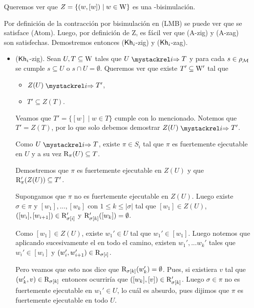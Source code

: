 \begin{demostracion}
    Queremos ver que $Z = \{(w,[w]) \mid w \in \mathrm{W}\}$ es una \KHilogic-bisimulación.
    
    Por definición de la contracción por bisimulación en (LMB) se puede ver que se satisface (Atom). Luego, por definición de Z, es fácil ver que (A-zig) y (A-zag) son satisfechas. Demostremos entonces ($\mathsf{Kh}_i$-zig) y ($\mathsf{Kh}_i$-zag).

    \begin{itemize}
        \item ($\mathsf{Kh}_i$-zig). Sean $U, T \subseteq \mathrm{W}$ tales que $U \ultsExecAgi T$ y para cada $s \in \rho_{\mathcal{M}}$ se cumple $s \subseteq U$ o 
        $s \cap U = \emptyset$. Queremos ver que existe $T' \subseteq \mathrm{W}'$ tal que

        \begin{multicols}{2}
            \begin{itemize}
                \item $Z(U) \ultsExecAgi T'$, 
                \item $T' \subseteq Z(T)$.
            \end{itemize}
        \end{multicols}
        Veamos que $T' = \{[w] \mid w \in T\}$ cumple con lo mencionado. Notemos que $T' = Z(T)$, por lo que solo debemos demostrar 
        $Z(U) \ultsExecAgi T'$.

        Como $U \ultsExecAgi T$, existe $\pi \in S_i$ tal que $\pi$ es fuertemente ejecutable en $U$ y a su vez $\mathrm{R}_\pi(U) \subseteq T$.

        Demostremos que $\pi$ es fuertemente ejecutable en $Z(U)$ y que $\mathrm{R}'_\pi(Z(U)) \subseteq T'$.

        Supongamos que $\pi$ no es fuertemente ejecutable en $Z(U)$. Luego existe $\sigma \in \pi$ y $[w_1],...,[w_k]$ 
        con $1 \le k \le |\sigma|$ tal que $[w_1] \in Z(U)$, $([w_i], [w_{i+1}]) \in \mathrm{R}'_{\sigma[i]}$ y 
        $\mathrm{R}'_{\sigma[k]}([w_k]) = \emptyset$.

        Como $[w_1] \in Z(U)$, existe $w_1' \in U$ tal que $w_1' \in [w_1]$. Luego notemos que aplicando sucesivamente el  
        en todo el camino, existen $w_1',...w_k'$ tales que $w_i' \in [w_i]$ y $(w_i',w_{i+1}') \in \mathrm{R}_{\sigma[i]}$.

        Pero veamos que esto nos dice que $\mathrm{R}_{\sigma[k]}(w_k') = \emptyset$. Pues, si existiera $v$ tal que 
        $(w_k',v) \in \mathrm{R}_{\sigma[k]}$ entonces ocurriría que $([w_k],[v]) \in \mathrm{R}'_{\sigma[k]}$. Luego $\sigma \in \pi$ no es 
        fuertemente ejecutable en $w_1' \in U$, lo cuál es absurdo, pues dijimos que $\pi$ es fuertemente ejecutable en todo $U$.


\end{itemize}
\end{demostracion}
